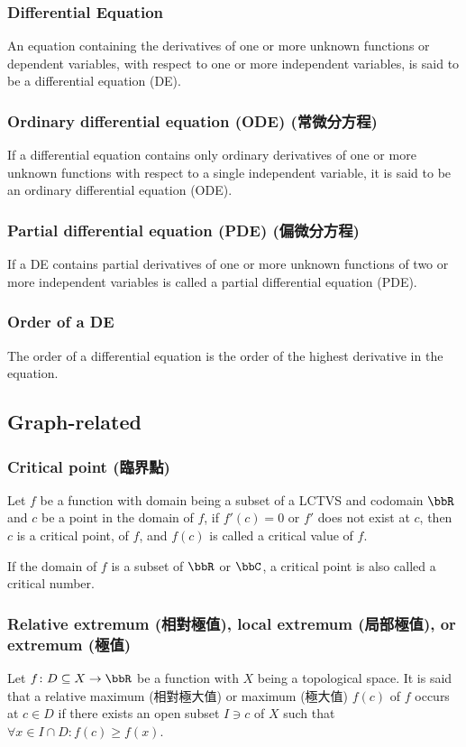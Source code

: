 \documentclass[a4paper,12pt]{report}
\begin{document}
\begin{itemize}
\begin{itemize}
\subsubsection{Differential Equation}
An equation containing the derivatives of one or more unknown functions or dependent variables, with respect to one or more independent variables, is said to be a differential equation (DE).
\subsubsection{Ordinary differential equation (ODE) (常微分方程)}
If a differential equation contains only ordinary derivatives of one or more unknown functions with respect to a single independent variable, it is said to be an ordinary differential equation (ODE).
\subsubsection{Partial differential equation (PDE) (偏微分方程)}
If a DE contains partial derivatives of one or more unknown functions of two or more independent variables is called a partial differential equation (PDE).
\subsubsection{Order of a DE}
The order of a differential equation is the order of the highest derivative in the equation.
\subsection{Graph-related}
\subsubsection{Critical point (臨界點)}
Let $f$ be a function with domain being a subset of a LCTVS and codomain $\bbR$ and \( c \) be a point in the domain of $f$, if \( f'(c) = 0 \) or \( f' \) does not exist at \( c \), then \( c \) is a critical point, of \( f \), and $f(c)$ is called a critical value of $f$.

If the domain of $f$ is a subset of $\bbR$ or $\bbC$, a critical point is also called a critical number.
\subsubsection{Relative extremum (相對極值), local extremum (局部極值), or extremum (極值)}
Let $f\colon D\subseteq X\to\bbR$ be a function with $X$ being a topological space. It is said that a relative maximum (相對極大值) or maximum (極大值) \( f(c) \) of \(f\) occurs at $c\in D$ if there exists an open subset $I\ni c$ of $X$ such that \( \forall x\in I\cap D\colon f(c) \geq f(x) \).


\end{itemize}
\end{itemize}
\end{document}
